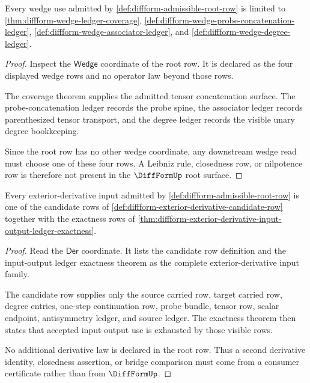 \begin{theorem}
\label{thm:diffform-root-row-wedge-scope}
Every wedge use admitted by \autoref{def:diffform-admissible-root-row} is
limited to \autoref{thm:diffform-wedge-ledger-coverage},
\autoref{def:diffform-wedge-probe-concatenation-ledger},
\autoref{def:diffform-wedge-associator-ledger}, and
\autoref{def:diffform-wedge-degree-ledger}.
\end{theorem}
\begin{proof}
Inspect the $\mathsf{Wedge}$ coordinate of the root row. It is declared as the
four displayed wedge rows and no operator law beyond those rows.

The coverage theorem supplies the admitted tensor concatenation surface. The
probe-concatenation ledger records the probe spine, the associator ledger
records parenthesized tensor transport, and the degree ledger records the
visible unary degree bookkeeping.

Since the root row has no other wedge coordinate, any downstream wedge read
must choose one of these four rows. A Leibniz rule, closedness row, or
nilpotence row is therefore not present in the $\DiffFormUp$ root surface.
\end{proof}

\begin{theorem}
\label{thm:diffform-root-row-derivative-scope}
Every exterior-derivative input admitted by
\autoref{def:diffform-admissible-root-row} is one of the candidate rows of
\autoref{def:diffform-exterior-derivative-candidate-row} together with the
exactness rows of
\autoref{thm:diffform-exterior-derivative-input-output-ledger-exactness}.
\end{theorem}
\begin{proof}
Read the $\mathsf{Der}$ coordinate. It lists the candidate row definition and
the input-output ledger exactness theorem as the complete exterior-derivative
input family.

The candidate row supplies only the source carried row, target carried row,
degree entries, one-step continuation row, probe bundle, tensor row, scalar
endpoint, antisymmetry ledger, and source ledger. The exactness theorem then
states that accepted input-output use is exhausted by those visible rows.

No additional derivative law is declared in the root row. Thus a second
derivative identity, closedness assertion, or bridge comparison must come from
a consumer certificate rather than from $\DiffFormUp$.
\end{proof}

